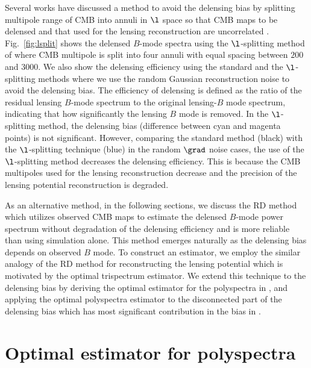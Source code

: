 \documentclass[aps,prd,twocolumn,superscriptaddress,groupedaddress,nofootinbib]{revtex4}
\begin{document}
Several works have discussed a method to avoid the delensing bias by splitting multipole range 
of CMB into annuli in $\l$ space so that CMB maps to be delensed and that used for 
the lensing reconstruction are uncorrelated \cite{Teng:2011xc,Sehgal:2016}. 
Fig.~\ref{fig:lsplit} shows the delensed $B$-mode spectra using the $\l$-splitting method 
of  where CMB multipole is split into four annuli with equal spacing between $200$ and $3000$. 
We also show the delensing efficiency using the standard and the $\l$-splitting methods 
where we use the random Gaussian reconstruction noise to avoid the delensing bias. 
The efficiency of delensing is defined as the ratio of the residual lensing $B$-mode spectrum to 
the original lensing-$B$ mode spectrum, indicating that how significantly the lensing $B$ mode is removed.
In the $\l$-splitting method, the delensing bias (difference between cyan and magenta points) 
is not significant. 
However, comparing the standard method (black) with the $\l$-splitting technique (blue) 
in the random $\grad$ noise cases, the use of the $\l$-splitting method decreases the delensing efficiency. 
This is because the CMB multipoles used for the lensing reconstruction decrease and 
the precision of the lensing potential reconstruction is degraded. 

As an alternative method, in the following sections, 
we discuss the RD method which utilizes observed CMB maps to estimate 
the delensed $B$-mode power spectrum without degradation of the delensing efficiency and 
is more reliable than using simulation alone. 
This method emerges naturally as the delensing bias depends on observed $B$ mode. 
To construct an estimator, we employ the similar analogy of the RD method 
for reconstructing the lensing potential \cite{Namikawa:2012} 
which is motivated by the optimal trispectrum estimator. 
We extend this technique to the delensing bias by deriving the optimal estimator 
for the polyspectra in , and applying the optimal polyspectra estimator 
to the disconnected part of the delensing bias which has most significant contribution in the bias 
in . 

\section{Optimal estimator for polyspectra} \label{opt}
\end{document}
